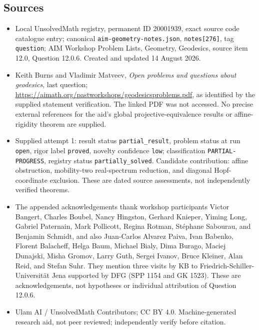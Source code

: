 \documentclass[11pt]{article}
\begin{document}
\subsection{Sources}
\begin{itemize}
\item Local UnsolvedMath registry, permanent ID 20001939, exact source code catalogue entry; canonical \texttt{aim-geometry-notes.json}, \texttt{notes[276]}, tag \texttt{question}; AIM Workshop Problem Lists, Geometry, Geodesics, source item 12.0, Question 12.0.6. Created and updated 14 August 2026.
\item Keith Burns and Vladimir Matveev, \emph{Open problems and questions about geodesics}, last question; \url{https://aimath.org/pastworkshops/geodesicsproblems.pdf}, as identified by the supplied statement verification. The linked PDF was not accessed. No precise external references for the aid's global projective-equivalence results or affine-rigidity theorem are supplied.
\item Supplied attempt 1: result status \texttt{partial\_result}, problem status at run \texttt{open}, rigor label \texttt{proved}, novelty confidence \texttt{low}; classification \texttt{PARTIAL-PROGRESS}, registry status \texttt{partially\_solved}. Candidate contribution: affine obstruction, mobility-two real-spectrum reduction, and diagonal Hopf-coordinate exclusion. These are dated source assessments, not independently verified theorems.
\item The appended acknowledgements thank workshop participants Victor Bangert, Charles Boubel, Nancy Hingston, Gerhard Knieper, Yiming Long, Gabriel Paternain, Mark Pollicott, Regina Rotman, Stéphane Sabourau, and Benjamin Schmidt, and also Juan-Carlos Alvarez Paiva, Ivan Babenko, Florent Balacheff, Helga Baum, Michael Bialy, Dima Burago, Maciej Dunajski, Misha Gromov, Larry Guth, Sergei Ivanov, Bruce Kleiner, Alan Reid, and Stefan Suhr. They mention three visits by KB to Friedrich-Schiller-Universität Jena supported by DFG (SPP 1154 and GK 1523). These are acknowledgements, not hypotheses or individual attribution of Question 12.0.6.
\item Ulam AI / UnsolvedMath Contributors; CC BY 4.0. Machine-generated research aid, not peer reviewed; independently verify before citation.
\end{itemize}
\end{document}
